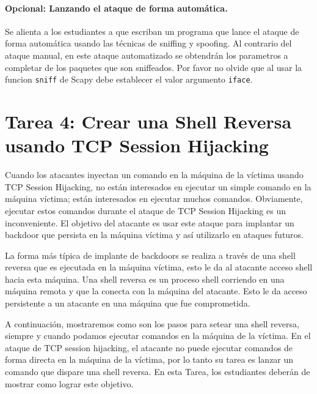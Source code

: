 \paragraph{Opcional: Lanzando el ataque de forma automática.}
Se alienta a los estudiantes a que escriban un programa que lance el ataque de forma automática usando las técnicas de sniffing y spoofing. Al contrario del ataque manual, en este ataque automatizado se obtendrán los parametros a completar de los paquetes que son sniffeados.
Por favor no olvide que al usar la funcion \texttt{sniff} de Scapy debe establecer el valor argumento \texttt{iface}.





\section{Tarea 4: Crear una Shell Reversa usando TCP Session Hijacking}

Cuando los atacantes inyectan un comando en la máquina de la víctima usando
TCP Session Hijacking, no están interesados en ejecutar un simple
comando en la máquina víctima; están interesados en ejecutar muchos
comandos. Obviamente, ejecutar estos comandos durante el ataque de TCP Session Hijacking es un inconveniente. El objetivo del atacante es usar este
ataque para implantar un backdoor que persista en la máquina víctima y así utilizarlo en ataques futuros.

La forma más típica de implante de backdoors se realiza a través de una shell reversa que es ejecutada en la máquina víctima, esto le da al atacante acceso shell hacia esta máquina.
Una shell reversa es un proceso shell corriendo en una máquina remota y que la conecta con la máquina del atacante. Esto le da acceso persistente a un atacante en una máquina que fue comprometida.

A continuación, mostraremos como son los pasos para setear una shell reversa, siempre y cuando podamos ejecutar comandos en la máquina de la víctima.
En el ataque de TCP session hijacking, el atacante no puede ejecutar comandos de forma directa en la máquina de la víctima, por lo tanto su tarea es lanzar un comando que dispare una shell reversa.
En esta Tarea, los estudiantes deberán de mostrar como lograr este objetivo.

